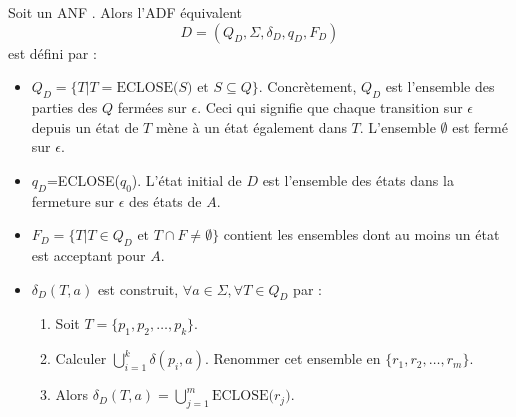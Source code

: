 Soit un ANF \automaton. Alors l'ADF équivalent
$$
D=(Q_D, \Sigma, \delta_D, q_D, F_D)
$$
est défini par :
\begin{itemize}
	\item $Q_D = \{T | T=\text{ECLOSE(}S\text{)} \text{ et } S \subseteq Q\}$. Concrètement, $Q_D$ est l'ensemble des parties des $Q$ fermées sur $\epsilon$. Ceci qui signifie que chaque transition sur $\epsilon$ depuis un état de $T$ mène à un état également dans $T$. L'ensemble $\emptyset$ est fermé sur $\epsilon$.
	\item $q_D$=ECLOSE($q_0$). L'état initial de $D$ est l'ensemble des états dans la fermeture sur $\epsilon$ des états de $A$.
	\item $F_D= \{T|T \in Q_D \text{ et } T \cap F \neq \emptyset\}$ contient les ensembles dont au moins un état est acceptant pour $A$.
	\item $\delta_D(T,a)$ est construit, $\forall a \in \Sigma, \forall T \in Q_D$ par :
		\begin{enumerate}
			\item Soit $T=\{p_1, p_2,\dots,p_k\}$.
			\item Calculer $\bigcup_{i=1}^k\delta(p_i,a)$. Renommer cet ensemble en $\{r_1, r_2, \dots, r_m\}$.
			\item Alors $\delta_D(T,a)=\bigcup_{j=1}^m\text{ECLOSE(}r_j\text{)}$.
		\end{enumerate}
\end{itemize}


